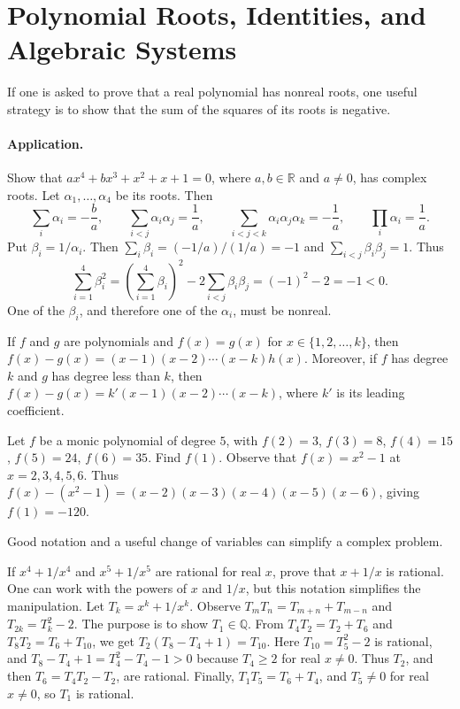 \documentclass[11pt,a4paper]{article}
\begin{document}
\section*{Polynomial Roots, Identities, and Algebraic Systems}
\setcounter{theorem}{13}\begin{lemma}
If one is asked to prove that a real polynomial has nonreal roots, one useful
strategy is to show that the sum of the squares of its roots is negative.
\end{lemma}
\paragraph{Application.}
Show that $ax^4+bx^3+x^2+x+1=0$, where $a,b\in\mathbb R$ and $a\ne0$, has complex roots.
Let $\alpha_1,\ldots,\alpha_4$ be its roots. Then
\[
\sum_i\alpha_i=-\frac ba,\qquad
\sum_{i<j}\alpha_i\alpha_j=\frac1a,\qquad
\sum_{i<j<k}\alpha_i\alpha_j\alpha_k=-\frac1a,\qquad
\prod_i\alpha_i=\frac1a.
\]
Put $\beta_i=1/\alpha_i$. Then $\sum_i\beta_i=(-1/a)/(1/a)=-1$ and
$\sum_{i<j}\beta_i\beta_j=1$. Thus
\[
\sum_{i=1}^4\beta_i^2=\left(\sum_{i=1}^4\beta_i\right)^2
-2\sum_{i<j}\beta_i\beta_j=(-1)^2-2=-1<0.
\]
One of the $\beta_i$, and therefore one of the $\alpha_i$, must be nonreal.

\setcounter{theorem}{49}\begin{lemma}
If $f$ and $g$ are polynomials and $f(x)=g(x)$ for $x\in\{1,2,\ldots,k\}$, then
$f(x)-g(x)=(x-1)(x-2)\cdots(x-k)h(x)$.
Moreover, if $f$ has degree $k$ and $g$ has degree less than $k$, then
$f(x)-g(x)=k'(x-1)(x-2)\cdots(x-k)$, where $k'$ is its leading coefficient.
\end{lemma}
Let $f$ be a monic polynomial of degree $5$, with
$f(2)=3$, $f(3)=8$, $f(4)=15$, $f(5)=24$, $f(6)=35$. Find $f(1)$.
Observe that $f(x)=x^2-1$ at $x=2,3,4,5,6$.
Thus $f(x)-(x^2-1)=(x-2)(x-3)(x-4)(x-5)(x-6)$, giving $f(1)=-120$.

\setcounter{theorem}{56}\begin{lemma}
Good notation and a useful change of variables can simplify a complex problem.
\end{lemma}
If $x^4+1/x^4$ and $x^5+1/x^5$ are rational for real $x$, prove that $x+1/x$ is rational.
One can work with the powers of $x$ and $1/x$, but this notation simplifies
the manipulation.
Let $T_k=x^k+1/x^k$. Observe
$T_mT_n=T_{m+n}+T_{m-n}$ and $T_{2k}=T_k^2-2$.
The purpose is to show $T_1\in\mathbb Q$.
From $T_4T_2=T_2+T_6$ and $T_8T_2=T_6+T_{10}$,
we get $T_2(T_8-T_4+1)=T_{10}$. Here $T_{10}=T_5^2-2$ is rational,
and $T_8-T_4+1=T_4^2-T_4-1>0$ because $T_4\geq2$ for real
$x\ne0$. Thus $T_2$, and then $T_6=T_4T_2-T_2$, are rational.
Finally, $T_1T_5=T_6+T_4$, and $T_5\ne0$ for real $x\ne0$, so $T_1$ is rational.
\end{document}
